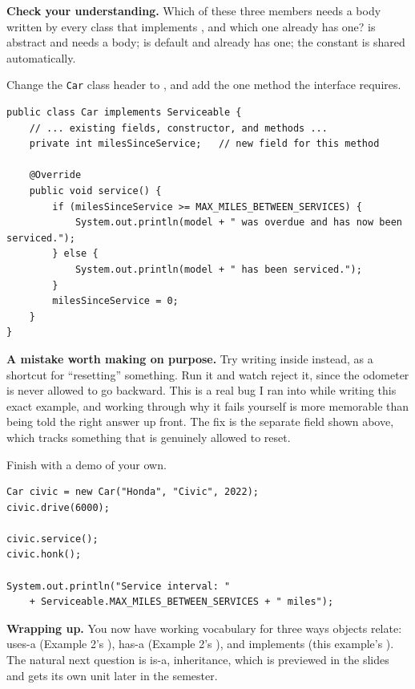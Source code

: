 \documentclass[11pt]{article}
\begin{document}
\textbf{Check your understanding.} Which of these three members needs a body
written by every class that implements , and which one
already has one?  is abstract and needs a body;  is
default and already has one; the constant is shared automatically.

Change the \texttt{Car} class header to , and add
the one method the interface requires.

\begin{lstlisting}[style=java]
public class Car implements Serviceable {
    // ... existing fields, constructor, and methods ...
    private int milesSinceService;   // new field for this method

    @Override
    public void service() {
        if (milesSinceService >= MAX_MILES_BETWEEN_SERVICES) {
            System.out.println(model + " was overdue and has now been serviced.");
        } else {
            System.out.println(model + " has been serviced.");
        }
        milesSinceService = 0;
    }
}
\end{lstlisting}

\textbf{A mistake worth making on purpose.} Try writing 
inside  instead, as a shortcut for ``resetting'' something. Run
it and watch  reject it, since the odometer is never
allowed to go backward. This is a real bug I ran into while writing this exact
example, and working through why it fails yourself is more memorable than
being told the right answer up front. The fix is the separate
 field shown above, which tracks something that is
genuinely allowed to reset.

Finish with a demo of your own.

\begin{lstlisting}[style=java]
Car civic = new Car("Honda", "Civic", 2022);
civic.drive(6000);

civic.service();
civic.honk();

System.out.println("Service interval: "
    + Serviceable.MAX_MILES_BETWEEN_SERVICES + " miles");
\end{lstlisting}

\textbf{Wrapping up.} You now have working vocabulary for three ways objects
relate: uses-a (Example 2's ), has-a (Example 2's
), and implements (this example's ). The natural
next question is is-a, inheritance, which is previewed in the slides and gets
its own unit later in the semester.
\end{document}
